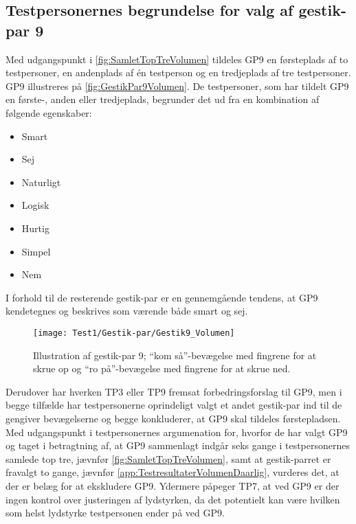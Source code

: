 \subsection{Testpersonernes begrundelse for valg af gestik-par 9}
\label{TestresultaterValgAfGestikkerBegrundelseGP9Volumen}
% 
Med udgangspunkt i \autoref{fig:SamletTopTreVolumen} tildeles GP9 en førsteplads af to testpersoner, en andenplads af én testperson og en tredjeplads af tre testpersoner. GP9 illustreres på \autoref{fig:GestikPar9Volumen}. De testpersoner, som har tildelt GP9 en første-, anden eller tredjeplads, begrunder det ud fra en kombination af følgende egenskaber: 
%
\begin{multicols}{3}
    \begin{itemize}
        \item Smart
        \item Sej
        \item Naturligt
        \item Logisk
        \item Hurtig
        \item Simpel 
        \item Nem
\end{itemize}
\end{multicols}
\noindent
%  
I forhold til de resterende gestik-par er en gennemgående tendens, at GP9 kendetegnes og beskrives som værende både smart og sej.
%
\begin{figure}[H]
	\centering
	\texttt{[image: Test1/Gestik-par/Gestik9\_Volumen]}
	\caption{Illustration af gestik-par 9; \enquote{kom så}-bevægelse med fingrene for at skrue op og \enquote{ro på}-bevægelse med fingrene for at skrue ned.}
		\label{fig:GestikPar9Volumen}
\end{figure}
\noindent
%
Derudover har hverken TP3 eller TP9 fremsat forbedringsforslag til GP9, men i begge tilfælde har testpersonerne oprindeligt valgt et andet gestik-par ind til de gengiver bevægelserne og begge konkluderer, at GP9 skal tildeles førstepladsen.\blankline
%    
Med udgangspunkt i testpersonernes argumenation for, hvorfor de har valgt GP9 og taget i betragtning af, at GP9 sammenlagt indgår seks gange i testpersonernes samlede top tre, jævnfør \autoref{fig:SamletTopTreVolumen}, samt at gestik-parret er fravalgt to gange, jævnfør \autoref{app:TestresultaterVolumenDaarlig}, vurderes det, at der er belæg for at ekskludere GP9. Ydermere påpeger TP7, at ved GP9 er der ingen kontrol over justeringen af lydstyrken, da det potentielt kan være hvilken som helst lydstyrke testpersonen ender på ved GP9. 
%
